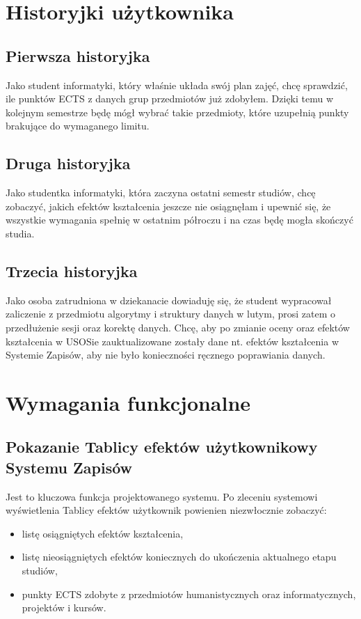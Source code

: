 \documentclass{article}
\begin{document}
\section{Historyjki użytkownika}
\subsection{Pierwsza historyjka}
Jako student informatyki, który właśnie układa swój plan zajęć, chcę sprawdzić, ile punktów ECTS z danych grup przedmiotów już zdobyłem.
Dzięki temu w kolejnym semestrze będę mógł wybrać takie przedmioty, które uzupełnią punkty brakujące do wymaganego limitu.
\subsection{Druga historyjka}
Jako studentka informatyki, która zaczyna ostatni semestr studiów, chcę zobaczyć, jakich efektów kształcenia jeszcze nie osiągnęłam i upewnić się, że wszystkie wymagania spełnię w ostatnim półroczu i na czas będę mogła skończyć studia.
\subsection{Trzecia historyjka}
Jako osoba zatrudniona w dziekanacie dowiaduję się, że student wypracował zaliczenie z przedmiotu algorytmy i struktury danych w lutym, prosi zatem o przedłużenie sesji oraz korektę danych. 
Chcę, aby po zmianie oceny oraz efektów kształcenia w USOSie zauktualizowane zostały dane nt. efektów kształcenia w Systemie Zapisów, aby nie było konieczności ręcznego poprawiania danych.


\section{Wymagania funkcjonalne}

\subsection{Pokazanie Tablicy efektów użytkownikowy Systemu Zapisów}
Jest to kluczowa funkcja projektowanego systemu.
Po zleceniu systemowi wyświetlenia Tablicy efektów użytkownik powienien niezwłocznie zobaczyć:
\begin{itemize}
	\item listę osiągniętych efektów kształcenia,
	\item listę nieosiągniętych efektów koniecznych do ukończenia aktualnego etapu studiów,
	\item punkty ECTS zdobyte z przedmiotów humanistycznych oraz informatycznych, projektów i kursów.
\end{itemize}
\end{document}
